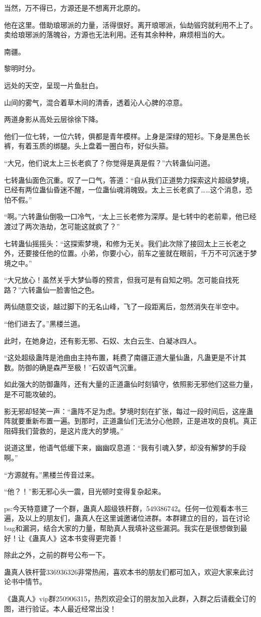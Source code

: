 \begin{this_body}
当然，万不得已，方源还是不想离开北原的。

他在这里。借助琅琊派的力量，活得很好。离开琅琊派，仙劫锻窍就利用不上了。卖给琅琊派的落魄谷，方源也无法利用。还有其余种种，麻烦相当的大。

南疆。

黎明时分。

远处的天空，呈现一片鱼肚白。

山间的雾气，混合着草木间的清香，透着沁人心脾的凉意。

两道身影从高处云层徐徐下降。

他们一位七转，一位六转，俱都是青年模样。上身是深绿的短衫。下身是黑色长裤，有着玉质的绑腿。头上盘着一圈白布，好似头箍。

“大兄，他们说太上三长老疯了？你觉得是真是假？”六转蛊仙问道。

七转蛊仙面色沉重。叹了一口气，答道：“自从我们正道势力探索这片超级梦境，已经有两位蛊仙昏迷不醒，一位蛊仙魂消魄毁。太上三长老疯了……这个消息，恐怕不假。”

“啊。”六转蛊仙倒吸一口冷气，“太上三长老修为深厚。是七转中的老前辈，他已经渡过了两次浩劫，怎可能这就疯了？”

七转蛊仙摇摇头：“这探索梦境，和修为无关。我们此次除了接回太上三长老之外，还要接任他的位置。小弟，你要小心，前车之鉴就在眼前，千万不可沉迷于梦境之中。”

“大兄放心！虽然关乎大梦仙尊的预言，但我可是有自知之明。怎可能自找死路？”六转蛊仙一脸害怕之色。

两仙随意交谈，越过脚下的无名山峰，飞了一段距离后，忽然消失在半空中。

“他们进去了。”黑楼兰道。

此时，在她身边，还有影无邪、石奴、太白云生、白凝冰四人。

“这处超级蛊阵是池曲由主持布置，耗费了南疆正道大量仙蛊，凡蛊更是不计其数。防御的确是森严至极！”石奴语气沉重。

如此强大的防御蛊阵，还有大量的正道蛊仙时刻镇守，依照影无邪他们这些力量，是不可能攻破的。

影无邪却轻笑一声：“蛊阵不足为虑。梦境时刻在扩张，每过一段时间后，这座蛊阵就要重新布置一遍。到那时，正道蛊仙们无法分心他顾，正是进攻的良机。真正阻碍我们营救的，是这片庞大的梦境。”

说道这里，他语气低缓下来，幽幽叹息道：“我有引魂入梦，却没有解梦的手段啊。”

“方源就有。”黑楼兰传音过来。

“他？！”影无邪心头一震，目光顿时变得复杂起来。

ps:今天特意建了一个群，蛊真人超级铁杆群，549386742。任何一位观看本书三遍，及以上的朋友们，蛊真人在这里诚邀诸位进群。本群建立的目的，旨在讨论bug和漏洞，结合大家的力量，帮助真人我填补这些漏洞。我实在是很想做到最好！让《蛊真人》这本书变得更完善！

除此之外，之前的群号公布一下。

蛊真人铁杆营336936326非常热闹，喜欢本书的朋友们都可加入，欢迎大家来此讨论书中情节。

《蛊真人》vip群250906315，热烈欢迎全订的朋友加入此群，入群之后请截全订的图，进行验证。本人最近经常出没！

\end{this_body}


